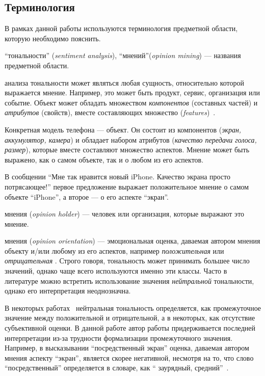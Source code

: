 \subsection{Терминология}

 В рамках данной работы используются терминология предметной области, 
 которую необходимо пояснить.

``{ тональности}'' (\textit{sentiment analysis}), 
``{ мнений}''(\textit{opinion mining}) --- названия предметной области.

{} анализа тональности может являться любая сущность, 
относительно которой выражается мнение. Например, это может быть продукт,
сервис, организация или событие. Объект может обладать множеством 
\textit{компонентов}  (составных частей) и \textit{атрибутов} (свойств), 
вместе составляющих множество {} 
(\textit{features})~\cite{Liu2010}.

Конкретная модель телефона --- объект. Он состоит из компонентов 
(\textit{экран, аккумулятор, камера}) и обладает набором атрибутов 
(\textit{качество передачи голоса, размер}), 
которые вместе составляют множество аспектов. 
Мнение может быть выражено, как о самом объекте, так и о любом из его аспектов.

В сообщении ``Мне так нравится новый iPhone. Качество экрана просто потрясающее!'' 
первое предложение выражает положительное мнение о самом объекте ``iPhone'', 
а второе --- о его аспекте ``экран''.

{ мнения} (\textit{opinion holder}) --- человек или организация, которые 
выражают это мнение. 

{ мнения} (\textit{opinion orientation}) --- эмоциональная оценка, 
даваемая автором мнения объекту и/или любому из его аспектов, например \textit{
положительная} или \textit{отрицательная} . Строго говоря, тональность может 
принимать большее число значений, однако чаще всего используются именно эти 
классы. Часто в литературе можно встретить использование значения \textit{
нейтральной} тональности, однако его интерпретация неоднозначна. 

В некоторых работах~\cite{Pang2008} нейтральная тональность определяется, как 
промежуточное значение между положительной и отрицательной, а в некоторых, 
как отсутствие субъективной оценки. В данной работе автор работы 
придерживается последней интерпретации из-за трудности формализации 
промежуточного значения. Например, в высказывании ``посредственный экран'' 
оценка, даваемая автором мнения аспекту ``экран'', является скорее негативной, 
несмотря на то, что слово ``посредственный'' определяется в словаре, как ``
заурядный, средний''~\cite{wiki_middling}.

